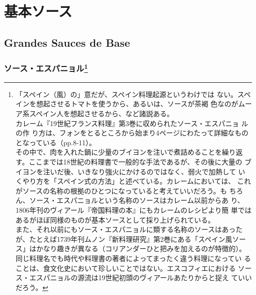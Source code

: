 \hypertarget{ux57faux672cux30bdux30fcux30b9}{%
\section{基本ソース}\label{ux57faux672cux30bdux30fcux30b9}}

\hypertarget{grandes-sauces-de-base}{%
\subsection{Grandes Sauces de Base}\label{grandes-sauces-de-base}}

\begin{recette}
\hypertarget{ux30bdux30fcux30b9ux30a8ux30b9ux30d1ux30cbux30e7ux30eb102008}{%
\subsubsection[ソース・エスパニョル]{\texorpdfstring{ソース・エスパニョル\footnote{「スペイン（風）の」意だが、スペイン料理起源というわけでは
  ない。スペインを想起させるトマトを使うから、あるいは、ソースが茶褐
  色なのがムーア系スペイン人を想起させるから、など諸説ある。\\
  カレーム『19世紀フランス料理』第3巻に収められたソース・エスパニョ
  ルの作
  り方は、フォンをとるところから始まり4ページにわたって詳細なものとなっている（pp.8-11）。\\
  その中で、肉を入れた鍋に少量のブイヨンを注いで煮詰めることを繰り返
  す。ここまでは18世紀の料理書で一般的な手法であるが、その後に大量の
  ブイヨンを注いだ後、いきなり強火にかけるのではなく、弱火で加熱して
  いくやり方を「スペイン式の方法」と述べている。カレームにおいては、
  これがソースの名称の根拠のひとつになっていると考えていいだろう。も
  ちろん、ソース・エスパニョルという名称のソースはカレーム以前からあ
  り、1806年刊のヴィアール『帝国料理の本』にもカレームのレシピより簡
  単ではあるがほぼ同様のものが基本ソースとして採り上げられている。\\
  また、それ以前にもソース・エスパニョルに類する名称のソースはあった
  が、たとえば1739年刊ムノン『新料理研究』第2巻にある「スペイン風ソー
  ス」はかなり趣きが異なる（コリアンダーひと把みを加えるのが特徴的）。
  同じ料理名でも時代や料理書の著者によってまったく違う料理になってい
  ることは、食文化史において珍しいことではない。エスコフィエにおける
  ソース・エスパニョルの源流は19世紀初頭のヴィアールあたりからと捉え
  ていいだろう。}}{ソース・エスパニョル}}\label{ux30bdux30fcux30b9ux30a8ux30b9ux30d1ux30cbux30e7ux30eb102008}}


\end{recette}
